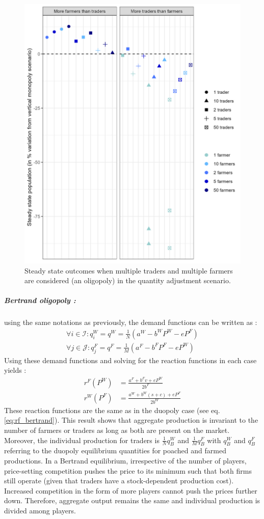 \begin{figure}[H]
    \centering
    \includegraphics[width=.7\textwidth]{figures/totoaba/sup_figure1.jpg}
    \caption{Steady state outcomes when multiple traders and multiple farmers are  considered (an oligopoly) in the quantity adjustment scenario.}
    \label{fig:cournot_oligo}
\end{figure}
%
\subparagraph{Bertrand oligopoly :}
using the same notations as previously, the demand functions can be written as : 
\begin{align}
    \forall i\in \mathcal{I} : q^W_i = q^W = \frac{1}{N}(a^W - b^W P^W - e P^F)\\
    \forall j \in \mathcal{J} : q^F_j = q^F = \frac{1}{M}(a^F - b^F P^F - e P^W)
\end{align}
Using these demand functions and solving for the reaction functions in each case yields : 
\begin{align}
    r^F(P^W) &= \frac{a^F + b^F v + eP^W}{2b^F}\\
    r^W(P^F) &= \frac{a^W + b^W (s+c) + e P^F}{2b^W}
\end{align}
These reaction functions are the same as in the duopoly case (see eq. \ref{eq:rf_bertrand}). This result shows that aggregate production is invariant to the number of farmers or traders as long as both are present on the market. Moreover, the individual production for traders is $\frac{1}{N} q^W_B$ and $\frac{1}{M}q^F_B$ with $q^W_B$ and $q^F_B$ referring to the duopoly equilibrium quantities for poached and farmed productions. In a Bertrand equilibrium, irrespective of the number of players, price-setting competition pushes the price to its minimum such that both firms still operate (given that traders have a stock-dependent production cost). Increased competition in the form of more players cannot push the prices further down. Therefore, aggregate output remains the same and individual production is divided among players. \\
